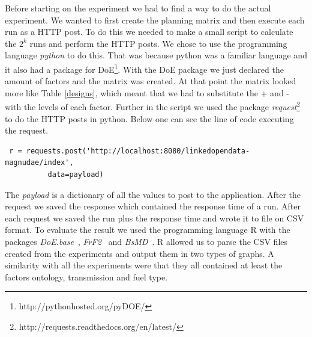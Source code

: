 \documentclass{llncs}
\begin{document}
Before starting on the experiment we had to find a way to do the actual experiment. We wanted to 
first create the planning matrix and then execute each run as a HTTP post. To do this we needed to 
make a small script to calculate the $2^k$ runs and perform the HTTP posts. We chose to use 
the programming language \textit{python} to do this. That was because python was a familiar language  
and it also had a package for DoE\footnote{http://pythonhosted.org/pyDOE/}. With the DoE package we just declared 
the amount of factors and the matrix was created. At that point the matrix looked more like Table 
\ref{designs}, which meant that we had to substitute the + and - with the levels of each factor. 
Further in the script we used the package \textit{request}\footnote{http://requests.readthedocs.org/en/latest/} 
to do the HTTP posts in python. Below one can see the line of code executing the request.
\scriptsize\begin{lstlisting}
 r = requests.post('http://localhost:8080/linkedopendata-magnudae/index', 
		  data=payload)
\end{lstlisting}
\normalsize
The \textit{payload} is a dictionary of all the values to post to the application. 
After the request we saved the response which contained the response 
time of a run. After each request we saved the run plus the response time and wrote 
it to file on CSV format. To evaluate the result we used the programming language 
R with the packages \textit{DoE.base}~\cite{DoEBase}, \textit{FrF2}~\cite{FrF2} 
and \textit{BsMD}~\cite{BsMD}. R allowed us to parse 
the CSV files created from the experiments and output them in two types of graphs. 
A similarity with all the experiments were that they all contained at least the factors 
ontology, transmission and fuel type.
\end{document}
